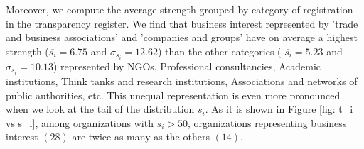 \documentclass[ 11pt]{article}
\begin{document}
Moreover, we compute the average strength grouped by category of registration in the transparency register.
We find that business interest represented by 'trade and business associations' and 'companies and groups' have on average a highest strength ($\overline{s_i}  = 6.75 $ and $\sigma_{s_i} = 12.62$) than the other categories ( $\overline{s_i}  = 5.23$ and $\sigma_{s_i} = 10.13$) represented by NGOs,  Professional consultancies, Academic institutions, Think tanks and research institutions, Associations and networks of public authorities, etc. 
This unequal representation is even more pronounced when we look at the tail of the distribution $s_i$.
As it is shown in Figure \ref{fig: t_i vs s_i}, among organizations with $s_i >50$, organizations representing business interest $(28)$ are twice as many as the others $(14)$. 





    \newpage
    \printbibliography
   
\end{document}
